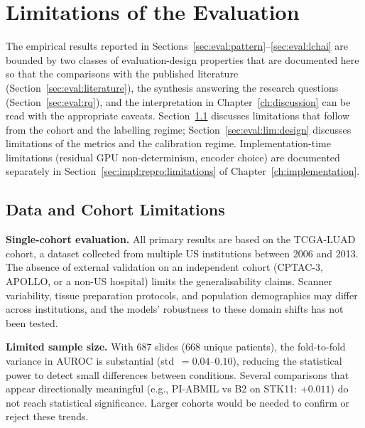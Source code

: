 \section{Limitations of the Evaluation}
\label{sec:eval:limitations}

The empirical results reported in
Sections~\ref{sec:eval:pattern}--\ref{sec:eval:lchai} are bounded
by two classes of evaluation-design properties that are documented
here so that the comparisons with the published literature
(Section~\ref{sec:eval:literature}), the synthesis answering the
research questions (Section~\ref{sec:eval:rq}), and the
interpretation in Chapter~\ref{ch:discussion} can be read with the
appropriate caveats.
Section~\ref{sec:eval:lim:data} discusses limitations that follow
from the cohort and the labelling regime; %
Section~\ref{sec:eval:lim:design} discusses limitations of the
metrics and the calibration regime.
Implementation-time limitations (residual GPU non-determinism,
encoder choice) are documented separately in
Section~\ref{sec:impl:repro:limitations} of
Chapter~\ref{ch:implementation}.

\subsection{Data and Cohort Limitations}
\label{sec:eval:lim:data}

\textbf{Single-cohort evaluation.}
All primary results are based on the TCGA-LUAD cohort, a dataset
collected from multiple US institutions between 2006 and 2013.
The absence of external validation on an independent cohort
(CPTAC-3, APOLLO, or a non-US hospital) limits the generalisability
claims.
Scanner variability, tissue preparation protocols, and population
demographics may differ across institutions, and the models'
robustness to these domain shifts has not been tested.

\textbf{Limited sample size.}
With 687 slides (668 unique patients), the fold-to-fold variance in
AUROC is substantial (std~$=0.04$--$0.10$), reducing the
statistical power to detect small differences between conditions.
Several comparisons that appear directionally meaningful
(e.g., PI-ABMIL vs B2 on STK11: $+0.011$) do not reach statistical
significance.
Larger cohorts would be needed to confirm or reject these trends.

